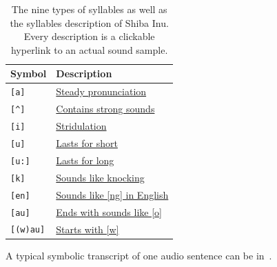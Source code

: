 \begin{table}[th]
\centering
\small
\begin{tabular}{l|l}
\hline
\textbf{Symbol} & \textbf{Description}\\
\hline
\verb|[a]| & \href{https://drive.google.com/file/d/1tobgLGw4VmCyT5DgltnAGF99hI0-isiv/view?usp=share_link}{Steady pronunciation} \\
\verb|[^]| & \href{https://drive.google.com/file/d/1QvvKeNjLhHYxpa9ehePRCO2AlzDZrouU/view?usp=share_link}{Contains strong sounds}\\
\verb|[i]| & \href{https://drive.google.com/file/d/1C5Y5-a7oEKNWcwy03MRf1UooOaHxpJJ2/view?usp=share_link}{Stridulation}\\
\verb|[u]| & \href{https://drive.google.com/file/d/1NzEY9oxAvNy8H_Jo5qEOIzYwOIAafOGw/view?usp=share_link}{Lasts for short}\\
\verb|[u:]| & \href{https://drive.google.com/file/d/15uOnxgU1k4TGZmgQrOQ0Btb8FttHMNEi/view?usp=share_link}{Lasts for long}\\
\verb|[k]| & \href{https://drive.google.com/file/d/1568I7KdnbtLDueXXBnBKU5yCseLgQAY4/view?usp=share_link}{Sounds like knocking}\\
\verb|[en]| & \href{https://drive.google.com/file/d/1R7wEkBSzxPS_6YaNG0z4YGB_9VmjqPzt/view?usp=share_link}{Sounds like [ng] in English}\\
\verb|[au]| &  \href{https://drive.google.com/file/d/1ZhJWxb24QBpgdzdN_-TIbc4_ma3TCsmS/view?usp=share_link}{Ends with sounds like [o]} \\
\verb|[(w)au]| & \href{https://drive.google.com/file/d/1vJ10GUSh2XSF3cyNvQAQuHyrtrWzU31t/view?usp=share_link}{Starts with [w]} \\

\hline
\end{tabular}
\caption{The nine types of syllables as well as the syllables description of Shiba Inu. 
Every description is a clickable hyperlink to an actual sound sample.}
\label{tab:alphabet}
\end{table}

A typical symbolic transcript of one audio sentence can be in~.


